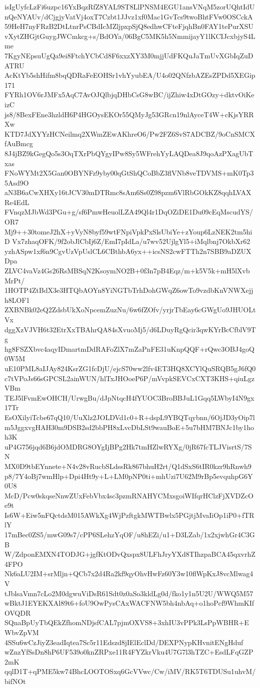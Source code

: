 isIgUyfcLzFi6uzpc16YxBqzRfZ8YAL9ST8LlPNSM4EGU1ansVNqM5zorUQhtIdU
nQeNYAUv/dCjgjyVatVj4oxT7Czbt1JJvz1xf0Mac1GvTcs9twoBhtFVw0OSCckA
59HeH7nyFRzB2DtLtnrPsCBdIcMZljpxpSjQ8edhwCFteFjqhBn0FAY1tePurXSU
vXytZHGjtGuygJWCmkcg+s/BdOYa/06BgC5MK5h5NmmijayY1lKCIJcxbjyS4Lme
7KgyNEpsuUgQa9ei8FtchYCbCd8F6xxzXY3M0mjjUdFKQuJaTmUvXGbIqZuDATRU
AcKtYb5shHifm8bqQDRaFeEOHSr1vhYyubEA/U4o02QNfzbAZEsZPDd5XEGip171
FYRh1OV6rJMFx5AqC7AvOJQlbjqDHbCsG8wBC/ijZhiw4xDtGOzy+dktvOiKeizC
js8/8BexFEne3hzldH6P4HGOysEKOr55QMyJg53GRcn19nlAyceT4W+cKjsYRRXw
KTD7JdXYYzHCNeilmq2XWmZEwAKhreO6/Pw2FZ6SvS7ADCBZ/9oCnSMCXfAuBmcg
8J4jBZ9kGegQo5s3OqTXrPbQYgyIPw8Sy5WFrehYyLAQDea8J9qoAzPXagUbTxas
FNoWYMt2X5Gan0OBYNFz9yby00qGtShQCoBbZ3flVNb8veTDVMS+mK0Tp35Asd9O
aN3B6aCwXHXy16tJCV30mDTRmc8sAm6Ss0Z98pzm6VlRbGOkKZ8qqhLVAXRe4EdL
FVnqzMJbWd3PGu+g/sf6PmwHeuolLZA49Ql4r1DqOZiDE1Du09cEqMscudYS/OR7
Mj9++30tomeJ2hX+yVyN8byf59wtFNpiVpkPxSlsUbiYe+zYoup6LzNEK2tm5hiD
Vx7zhaqOFK/9f2obJlCbIj6Z/EmI7pIdLa/u7wv52UjlgYl5+iMqlbnj7OkbXr62
yzhASpw1xf6n9CgvUzVpUslCL6CBthbA6yx++icsNS2cwFTTh2n7SBB9aDZUXDpa
ZLVC4vaVz4Gs26RsMBSqN2KsoymNO2B+0f3n7pB4Eqz/m+k5V5k+mH5lXvbMrPt/
1HOTP4ZtBdX3e3HTQbAOYn8YiNGTbTrhDohGWqZ6owTo9vzdbKnVNWXejjh8LOF1
ZXBNBk02eQ2ZdsbUkXoNpcemZuzNu/6w6fZOfv/yrjrTbEay6cGWgUo9JHUOLtVx
dggXzVJVH6t32EtrXxTBAhrQA84sXvuoMj5/d6LDuyRgQcir3qwKYrBcCfblV9Tg
hg8FSZXbvc4aqyIDmartmDdRAFoZlX7mZaPnFE31uKnpQQF+rQwc3OBJ4goQ0W5M
uE10PML8aIJAy824KsrZG1fcDjU/ejcS70ww2lfv4ET3HQ8XCYlQuSRQB5gJ6fQ0
c7tVPoJs66sGPCSL2ainWUN/hlTxJHOoeP6P/mVvpkSEVCxCXT3KHS+qiuLgzVBm
TEJ5lFvmEwOHCH/UrwgBu/dJpNtqcH4fYUOC3BroBBJuL1Gqq5LWbyI4N9gx17Tr
EsOXilyiTcbe67qQ10/UuXlz2JOLDVd1c0+R+dspL9YBQTqybnn/6OjJD3yOip7l
m5JggxvgHAH30m9DSB2sd2bbPH8xLvcDbLSt9wauBoE+5u7bHM7BNJc1by1hoh3K
uP4G756jqd6B6jdOMDRG8OYgIjBPg2Hk7tmHZlwRYXg/0jR67fcTLJVisrtS/7SN
MX0D9tbEYnnete+N4v28vRucbSLdssRk867bhuH2rt/Q1dSxS6tIR0kzr9hRnwh9
p8/7Y4oBj7wmHlp+Dpi4Ht9y+L+LM0pNP0ti+mhUzi7U62M9rBp5evquhpG6Y0U8
McD/Pcw0skqseNnwZUxFebVbx4sc3pzmRNAHYCMxsgoiWIfqrHClzFjXVDZcOe9t
Is6W+Eiw5nFQctdsM015AWkXg4WjPzftgkMWTBwlx5PGjtjMvaIiOp1iP0+fTRlY
17mBec0ZS5/mwG09s7/cPP6SLehzYqOF/u8hEZi/u1+D3LZab/1x2xjwhGr4C3GB
W/ZdponEMXN4TODJG+jgfKtODvQxspx8ULFhJryYXd8TIhzpaBCA45qxvrhZ4FPO
Nk6aLU2IM+srMljn+QCb7x2d4Ra2kf9qyOhvHwFz60Y3w10flWpKxJ8vcMlwag4V
tJblsaVmn7cLo2M0dgwuViDsR61Sdt0z0aSo3kldLg0d/fko1y1n5U2U/WWQ5M57
wBktJ1EYEKXAl89t6+foU9OwPysCAxWACFNW5bh4nbAq+o1hoPcf9WhmKIfOVQDR
SQnaBpUyTbQEkZfhomNDjsfCAL7pjmOXVS8+3xhIU3vPPk3LsPpWBHR+EWbvZpVM
4SSu6wCzJiyZ3eadIqtea7Sc5r11Edszd8jIElEclDd/DEXPNypKHvnitENgHduf
wZnzYfSsDn8hP6UF539o0knZRPxe11R4FYZkrVku4U7G7l3hTZC+EsdLFqGZP2mK
qqlD1T+qPME5kw74BhcLOOTOSxq6GcVVwc/Cw/iMV/RK5T6TDUSu1uhvM/bifNOt
